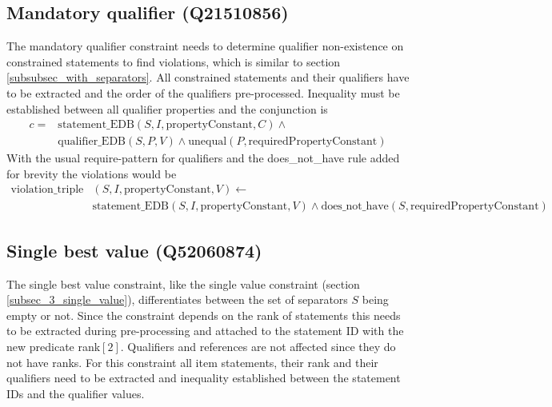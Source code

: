 \documentclass[hyperref,bachelorofscience,fleqn]{cgvpub}
\begin{document}
\subsection{Mandatory qualifier (Q21510856)}
The mandatory qualifier constraint needs to determine qualifier non-existence on constrained statements to find violations, which is similar to section \ref{subsubsec_with_separators}. All constrained statements and their qualifiers have to be extracted and the order of the qualifiers pre-processed. Inequality must be established between all qualifier properties and the conjunction is 
\begin{equation*}
\begin{split}
c = &\text{statement\_EDB}(S, I, \text{propertyConstant}, C) \wedge{} \\
&\text{qualifier\_EDB}(S, P, V) \wedge \text{unequal}(P, \text{requiredPropertyConstant})
\end{split}
\end{equation*}
With the usual require-pattern for qualifiers and the does\_not\_have rule added for brevity the violations would be
\begin{equation*}
\begin{split}
\text{violation\_triple}&(S, I, \text{propertyConstant}, V) \leftarrow \\
&\text{statement\_EDB}(S, I, \text{propertyConstant}, V) \wedge \text{does\_not\_have}(S, \text{requiredPropertyConstant})
\end{split}
\end{equation*}

\subsection{Single best value (Q52060874)}
The single best value constraint, like the single value constraint (section \ref{subsec_3_single_value}), differentiates between the set of separators \(S\) being empty or not. Since the constraint depends on the rank of statements this needs to be extracted during pre-processing and attached to the statement ID with the new predicate rank\([2]\). Qualifiers and references are not affected since they do not have ranks. For this constraint all item statements, their rank and their qualifiers need to be extracted and inequality established between the statement IDs and the qualifier values.\\
\end{document}

